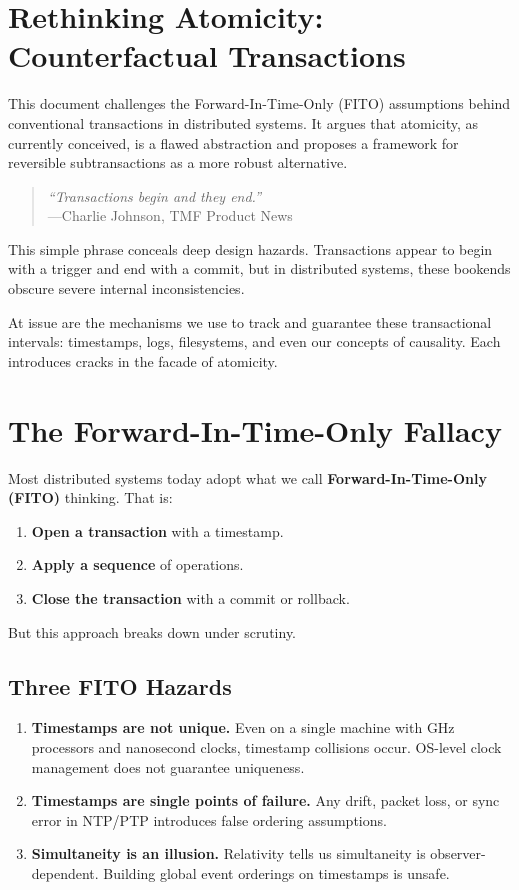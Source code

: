 \documentclass[../../../OAE-SPEC-MAIN.tex]{subfiles}
\begin{document}
\section{Rethinking Atomicity: Counterfactual Transactions}

This document challenges the Forward-In-Time-Only (FITO) assumptions behind conventional transactions in distributed systems. It argues that atomicity, as currently conceived, is a flawed abstraction and proposes a framework for reversible subtransactions as a more robust alternative.

\begin{quote}
\emph{“Transactions begin and they end.”}\\
\hspace*{0.5cm}---Charlie Johnson, TMF Product News
\end{quote}

This simple phrase conceals deep design hazards. Transactions appear to begin with a trigger and end with a commit, but in distributed systems, these bookends obscure severe internal inconsistencies. 

At issue are the mechanisms we use to track and guarantee these transactional intervals: timestamps, logs, filesystems, and even our concepts of causality. Each introduces cracks in the facade of atomicity.

\section{The Forward-In-Time-Only Fallacy}
Most distributed systems today adopt what we call \textbf{Forward-In-Time-Only (FITO)} thinking. That is:
\begin{enumerate}
  \item \textbf{Open a transaction} with a timestamp.
  \item \textbf{Apply a sequence} of operations.
  \item \textbf{Close the transaction} with a commit or rollback.
\end{enumerate}

But this approach breaks down under scrutiny.

\subsection*{Three FITO Hazards}
\begin{enumerate}
  \item \textbf{Timestamps are not unique.} Even on a single machine with GHz processors and nanosecond clocks, timestamp collisions occur. OS-level clock management does not guarantee uniqueness.
  \item \textbf{Timestamps are single points of failure.} Any drift, packet loss, or sync error in NTP/PTP introduces false ordering assumptions.
  \item \textbf{Simultaneity is an illusion.} Relativity tells us simultaneity is observer-dependent. Building global event orderings on timestamps is unsafe.
\end{enumerate}
\end{document}
